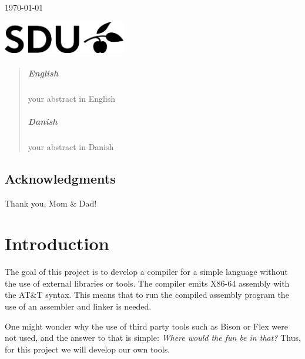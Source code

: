 \documentclass[a4paper,12pt]{report}
\begin{document}
\begin{titlepage}
\vfill\vfill

{\large\today} %

\vfill\vfill
\includegraphics[width=0.4\textwidth]{SDU_BLACK_RGB.png}\\[1cm]

\vfill

\end{titlepage}


\begin{abstract}
\paragraph{English}
your abstract in English

\paragraph{Danish}
your abstract in Danish
\end{abstract}

\newpage
\section*{Acknowledgments}
Thank you, Mom \& Dad!

\newpage
\tableofcontents

\newpage
{} 
\setcounter{page}{1}

\chapter{Introduction}
The goal of this project is to develop a compiler for a simple language without the use of external libraries or tools. The compiler emits X86-64 assembly with the AT\&T syntax. This means that to run the compiled assembly program the use of an assembler and linker is needed. 

One might wonder why the use of third party tools such as Bison or Flex were not used, and the answer to that is simple: \textit{Where would the fun be in that?} Thus, for this project we will develop our own tools. 
\end{document}
